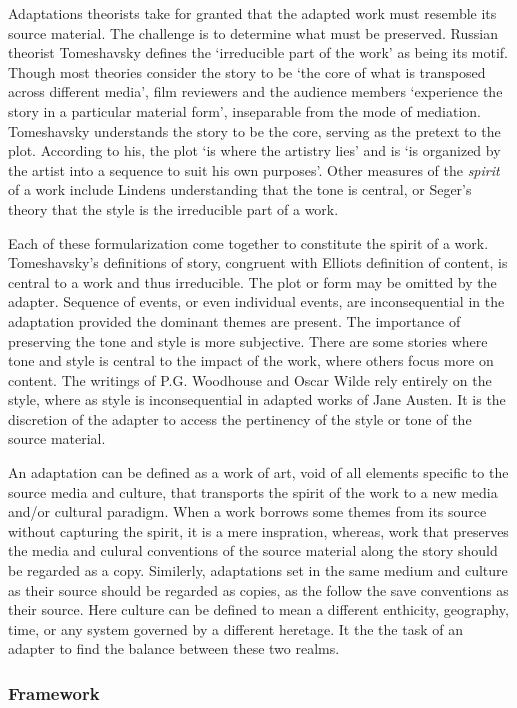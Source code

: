 \documentclass[12pt]{article}
\begin{document}
Adaptations theorists take for granted that the adapted work must resemble its
source material. The challenge is to determine what must be preserved. Russian
theorist Tomeshavsky defines the `irreducible part of the work' as being its
motif. Though most theories consider the story to be `the core of what is transposed
across different media', film reviewers and the audience members `experience the
story in a particular material form', inseparable from the mode of mediation.
Tomeshavsky understands the story to be the core, serving as the pretext to the
plot. According to his, the plot `is where the artistry lies' and is 
`is organized by the artist into a sequence to suit
   his own purposes'. Other measures of the \textit{spirit} of a work include
   Lindens understanding that the tone is central, or Seger's theory that
   the style is the irreducible part of a work.

Each of these formularization come together to constitute the spirit of a work.
Tomeshavsky's definitions of story, congruent with Elliots definition of
content, is central to a work and thus irreducible. The plot or form may be omitted by the
adapter. Sequence of events, or even individual events, are inconsequential in the
adaptation provided the dominant themes are present. The importance of
preserving the tone and style is more subjective. There are some stories where
tone and style is central to the impact of the work, where others focus more on
content. The writings of P.G. Woodhouse and Oscar Wilde rely entirely on the style, where as
style is inconsequential in adapted works of Jane Austen. It is the discretion of
the adapter to access the pertinency of the style or tone of the source material.

An adaptation can be defined as a work of art, void of all elements specific to
the source media and culture, that transports the spirit of the work to a new
media and/or cultural paradigm. When a work borrows some themes from its source
without capturing the spirit, it is a mere inspration, whereas, work that
preserves the media and culural conventions of the source material along the story should
be regarded as a copy. Similerly, adaptations set in the same medium and culture
as their source should be regarded as copies, as the follow the save conventions
as their source. Here culture can be defined to mean a different enthicity,
geography, time, or any system governed by a different heretage. 
It the the task of an adapter to find the balance between
these two realms.
\pagebreak
\subsubsection*{Framework}
\end{document}
